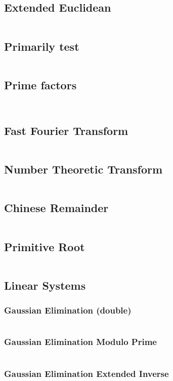 \documentclass[a4paper, 10pt, twocolumn, landscape]{article}
\begin{document}
  \subsection{Extended Euclidean}
  \inputminted{cpp}{math/extended-euclid.cpp}
  \subsection{Primarily test}
  \inputminted{cpp}{math/miller-rabin.cpp}
  \subsection{Prime factors}
  \inputminted{cpp}{math/prime-factors.cpp}
  \inputminted{cpp}{math/pollard-rho.cpp}
  \subsection{Fast Fourier Transform}
  \inputminted{cpp}{math/fft.cpp}
  \subsection{Number Theoretic Transform}
  \inputminted{cpp}{math/ntt.cpp}
  \subsection{Chinese Remainder}
  \inputminted{cpp}{math/chinese.cpp}
  \subsection{Primitive Root}
  \inputminted{cpp}{math/primitive-root.cpp}
  \subsection{Linear Systems}
  \subsubsection{Gaussian Elimination (double)}
  \inputminted{cpp}{math/gauss-elim.cpp}
  \subsubsection{Gaussian Elimination Modulo Prime}
  \inputminted{cpp}{math/gauss-elim-prime.cpp}
  \subsubsection{Gaussian Elimination Extended Inverse}
  \inputminted{cpp}{math/gauss-elim-ext.cpp}
\end{document}
